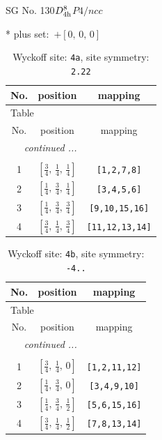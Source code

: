\documentclass[fleqn,8pt]{jsarticle}
\begin{document}
\setcounter{MaxMatrixCols}{32}

\renewcommand{\tablename}{Table~}
\renewcommand{\figurename}{Figure~}
\begin{center}
\LARGE
SG No. 130\quad$D_{\rm 4h}^{8}$\quad$P4/ncc$\quad[ tetragonal ]
\end{center}
* plus set:\,\,\,$+\left[ 0,\, 0,\, 0 \right]$
\renewcommand{\arraystretch}{1.2}
\begin{longtable}{ccc}
\caption{Wyckoff site: {\tt 4a}, site symmetry: {\tt 2.22}}
 \\
 \hline \hline
No. & position & mapping \\ \hline \endfirsthead

\multicolumn{2}{l}{\tablename\ \thetable{}} \\
 \hline \hline
No. & position & mapping \\ \hline \endhead

 \hline \hline
\multicolumn{2}{r}{\footnotesize\it continued ...} \\ \endfoot

 \hline \hline
\multicolumn{2}{r}{} \\ \endlastfoot

1 & $\left[ \frac{3}{4},\, \frac{1}{4},\, \frac{1}{4} \right]$ & {\tt [1,2,7,8]} \\ \hline
2 & $\left[ \frac{1}{4},\, \frac{3}{4},\, \frac{1}{4} \right]$ & {\tt [3,4,5,6]} \\ \hline
3 & $\left[ \frac{1}{4},\, \frac{3}{4},\, \frac{3}{4} \right]$ & {\tt [9,10,15,16]} \\ \hline
4 & $\left[ \frac{3}{4},\, \frac{1}{4},\, \frac{3}{4} \right]$ & {\tt [11,12,13,14]} \\
\end{longtable}
\renewcommand{\arraystretch}{1.2}
\begin{longtable}{ccc}
\caption{Wyckoff site: {\tt 4b}, site symmetry: {\tt -4..}}
 \\
 \hline \hline
No. & position & mapping \\ \hline \endfirsthead

\multicolumn{2}{l}{\tablename\ \thetable{}} \\
 \hline \hline
No. & position & mapping \\ \hline \endhead

 \hline \hline
\multicolumn{2}{r}{\footnotesize\it continued ...} \\ \endfoot

 \hline \hline
\multicolumn{2}{r}{} \\ \endlastfoot

1 & $\left[ \frac{3}{4},\, \frac{1}{4},\, 0 \right]$ & {\tt [1,2,11,12]} \\ \hline
2 & $\left[ \frac{1}{4},\, \frac{3}{4},\, 0 \right]$ & {\tt [3,4,9,10]} \\ \hline
3 & $\left[ \frac{1}{4},\, \frac{3}{4},\, \frac{1}{2} \right]$ & {\tt [5,6,15,16]} \\ \hline
4 & $\left[ \frac{3}{4},\, \frac{1}{4},\, \frac{1}{2} \right]$ & {\tt [7,8,13,14]} \\
\end{longtable}
\end{document}

